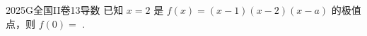 
\begin{problem}{2025}{G}{全国II卷}{13}{导数}
已知 $x=2$ 是 $f(x)=(x-1)(x-2)(x-a)$ 的极值点，则 $f(0)=$ \underline{\hspace{4em}}.
\end{problem}